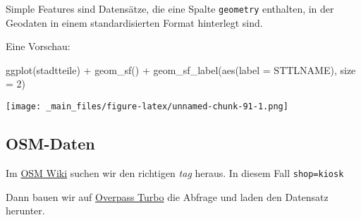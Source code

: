 \documentclass[
  ngerman,
]{article}
\newenvironment{Shaded}{\begin{snugshade}}{\end{snugshade}}
\newcommand{\AttributeTok}[1]{\textcolor[rgb]{0.77,0.63,0.00}{#1}}
\newcommand{\DecValTok}[1]{\textcolor[rgb]{0.00,0.00,0.81}{#1}}
\newcommand{\DocumentationTok}[1]{\textcolor[rgb]{0.56,0.35,0.01}{\textbf{\textit{#1}}}}
\newcommand{\FunctionTok}[1]{\textcolor[rgb]{0.00,0.00,0.00}{#1}}
\newcommand{\NormalTok}[1]{#1}
\newcommand{\SpecialCharTok}[1]{\textcolor[rgb]{0.00,0.00,0.00}{#1}}
\begin{document}
Simple Features sind Datensätze, die eine Spalte \texttt{geometry} enthalten, in der Geodaten in einem standardisierten Format hinterlegt sind.

\begin{Shaded}
\end{Shaded}

Eine Vorschau:

\begin{Shaded}
\begin{Highlighting}[]
\FunctionTok{ggplot}\NormalTok{(stadtteile) }\SpecialCharTok{+}
  \FunctionTok{geom\_sf}\NormalTok{() }\SpecialCharTok{+}
  \FunctionTok{geom\_sf\_label}\NormalTok{(}\FunctionTok{aes}\NormalTok{(}\AttributeTok{label =}\NormalTok{ STTLNAME), }\AttributeTok{size =} \DecValTok{2}\NormalTok{)}
\end{Highlighting}
\end{Shaded}

\texttt{[image: \_main\_files/figure-latex/unnamed-chunk-91-1.png]}

\hypertarget{osm-daten}{%
\subsection{OSM-Daten}\label{osm-daten}}

Im \href{https://wiki.openstreetmap.org/wiki/Map_Features}{OSM Wiki} suchen wir den richtigen \emph{tag} heraus. In diesem Fall \texttt{shop=kiosk}

Dann bauen wir auf \href{https://overpass-turbo.eu/}{Overpass Turbo} die Abfrage und laden den Datensatz herunter.
\end{document}
